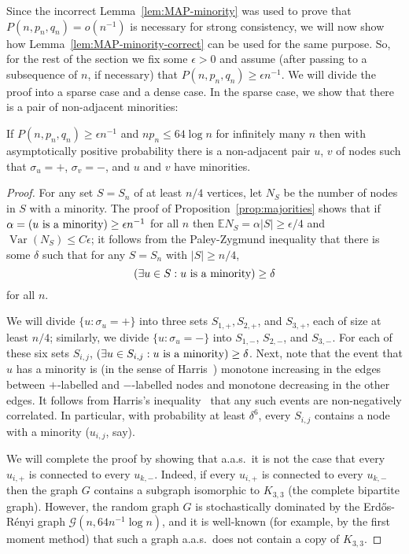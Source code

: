 \documentclass[EJP,final]{ejpecp}
\newcommand{\E}{\mathbb{E}}
\newcommand{\1}[1]{\mathbbm{1}_{\{#1\}}}
\newcommand{\calG}{\mathcal{G}}
\let\Pr\relax
\DeclareMathOperator{\Pr}{Pr}
\DeclareMathOperator{\Var}{Var}
\begin{document}
Since the incorrect Lemma~\ref{lem:MAP-minority} was used to prove that
$P(n, p_n, q_n) = o(n^{-1})$ is necessary for strong consistency, we will now show
how Lemma~\ref{lem:MAP-minority-correct} can be used for the same purpose.
So, for the rest of the section we fix some $\epsilon > 0$ and assume (after passing
to a subsequence of $n$, if necessary) that $P(n, p_n, q_n) \ge \epsilon n^{-1}$.
We will divide the proof into a sparse case and a dense case. In the sparse case,
we show that there is a pair of non-adjacent minorities:

\begin{lemma}\label{lem:erratum-sparse}
    If $P(n, p_n, q_n) \ge \epsilon n^{-1}$ and $n p_n \le 64 \log n$ for
    infinitely many $n$ then with asymptotically positive probability there is
    a non-adjacent pair $u$, $v$ of nodes such that $\sigma_u = +$, $\sigma_v =
    -$, and $u$ and $v$ have minorities.
\end{lemma}

\begin{proof}
    For any set $S = S_n$ of at least $n/4$ vertices, let $N_S$ be the number
    of nodes in $S$ with a minority. The proof of Proposition~\ref{prop:majorities}
    shows that if $\alpha = \Pr(u \text{ is a minority}) \ge \epsilon n^{-1}$
    for all $n$ then $\E N_S = \alpha |S| \ge \epsilon / 4$ and $\Var(N_S) \le C \epsilon$;
    it follows from the Paley-Zygmund inequality that there is some $\delta$ such
    that for any $S = S_n$ with $|S| \ge n/4$,
    \[
        \Pr(\exists u \in S: u \text{ is a minority}) \ge \delta
    \]
    for all $n$.

    We will divide $\{u: \sigma_u = +\}$ into three sets $S_{1,+}, S_{2,+}$,
    and $S_{3,+}$, each of size at least $n/4$; similarly, we divide $\{u: \sigma_u = -\}$
    into $S_{1,-}$, $S_{2,-}$, and $S_{3,-}$. For each of these six sets $S_{i,j}$,
    $\Pr(\exists u \in S_{i,j}: u \text{ is a minority}) \ge \delta$.
    Next, note that the event
    that $u$ has a minority is (in the sense of Harris~\cite{Harris:60})
    monotone increasing in the edges between $+$-labelled and $-$-labelled nodes
    and monotone decreasing in the other edges. It follows from Harris's
    inequality~\cite{Harris:60} that any such events are non-negatively correlated.
    In particular, with probability at least $\delta^6$, every $S_{i,j}$ contains a
    node with a minority ($u_{i,j}$, say).
    
    We will complete the proof by showing that a.a.s.\ it is not the case that
    every $u_{i,+}$ is connected to every $u_{k,-}$.  Indeed, if every
    $u_{i,+}$ is connected to every $u_{k,-}$ then the graph $G$ contains a
    subgraph isomorphic to $K_{3,3}$ (the complete bipartite graph).  However,
    the random graph $G$ is stochastically dominated by the Erd\H{o}s-R\'enyi
    graph $\calG(n,64 n^{-1} \log n)$, and it is well-known (for example, by
    the first moment method) that such a graph a.a.s.\ does not contain a copy
    of $K_{3,3}$.
\end{proof}
\end{document}
